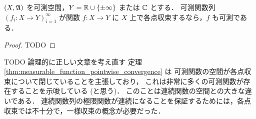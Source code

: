 \begin{theorem}\label{thm:measurable_function_pointwise_convergence}
    $(X,\mathfrak{A})$ を可測空間，$Y=\mathbb{R}\cup\{\pm\infty\}$ または $\mathbb{C}$ とする．
    可測関数列 $(f_i:X\to Y)_{i=1}^\infty$ が関数 $f:X\to Y$ に $X$ 上で各点収束するなら，$f$ も可測である．
\end{theorem}

\begin{proof}
    {\color{red} TODO}
\end{proof}

\begin{remark}
    {\color{red} TODO 論理的に正しい文章を考え直す}
    定理 \ref{thm:measurable_function_pointwise_convergence} は
    可測関数の空間が各点収束について閉じていることを主張しており，
    これは非常に多くの可測関数が存在することを示唆している (と思う)．
    このことは連続関数の空間との大きな違いである．
    連続関数列の極限関数が連続になることを保証するためには，各点収束では不十分で，一様収束の概念が必要だった．
\end{remark}
